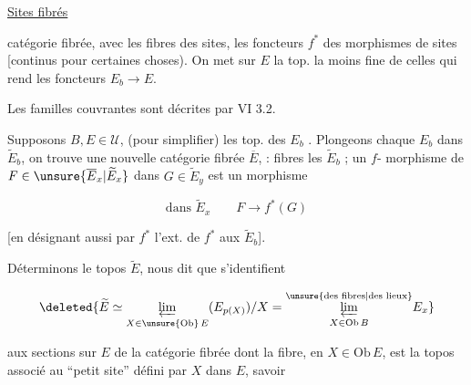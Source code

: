 \uline{Sites fibrés}


catégorie fibrée, avec les   fibres
des sites, les foncteurs $f^*$ des morphismes
de sites [continus  pour certaines
choses). On met sur $E$ la top. la moins fine de
celles qui rend  les foncteurs $E_b\longrightarrow E$.

Les familles couvrantes sont décrites par VI 3.2.

Supposons $B,E\in\mathcal U$,  (pour simplifier) les
top. des $E_b$ . Plongeons chaque
$E_b$ dans $\widetilde E_b$, on trouve une nouvelle catégorie
fibrée $\overline E$, : fibres les  $\widetilde E_b$ ; un $f$- morphisme de
$F\in\unsure{\overline E_x|\widetilde E_x}$ dans $G\in\widetilde E_y$ est un morphisme


\[
\text{dans }\widetilde E_x \qquad F\longrightarrow f^*(G)
\]

[en désignant aussi par $f^*$ l'ext.
de $f^*$ aux $\widetilde E_b$].

Déterminons le topos $\widetilde E$,  
 nous dit que    s'identifient

\[
\deleted{\widetilde E\simeq \underset{X\in\unsure{\mathrm{Ob}}\,E}{\underleftarrow{\lim}}
(E_{p(X)})/X = \overset{\text{\unsure{des fibres|des lieux}}}{\underset{X\in\mathrm{Ob}\, B}{\underleftarrow{\lim}}}E_x}
\]

 \unsure{,}
aux sections sur $E$ de la catégorie fibrée dont
la fibre, en $X\in\mathrm{Ob}\,E$, est la   topos
associé au ``petit site'' défini par $X$ dans $E$, savoir

